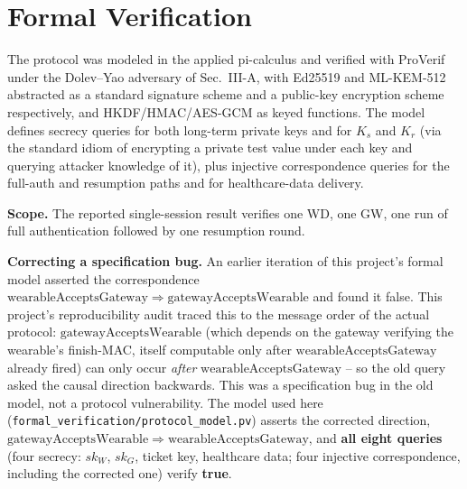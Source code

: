 \documentclass[conference]{IEEEtran}
\begin{document}
\section{Formal Verification}
\label{sec:fv}

The protocol was modeled in the applied pi-calculus and verified with
ProVerif \cite{blanchet2016} under the Dolev--Yao adversary of
Sec.~III-A, with Ed25519 and ML-KEM-512 abstracted as a standard signature
scheme and a public-key encryption scheme respectively, and
HKDF/HMAC/AES-GCM as keyed functions. The model defines secrecy queries for
both long-term private keys and for $K_s$ and $K_r$ (via the standard idiom
of encrypting a private test value under each key and querying attacker
knowledge of it), plus injective correspondence queries for the full-auth
and resumption paths and for healthcare-data delivery.

\textbf{Scope.} The reported single-session result verifies one WD, one GW,
one run of full authentication followed by one resumption round.

\textbf{Correcting a specification bug.} An earlier iteration of this
project's formal model asserted the correspondence
$\mathrm{wearableAcceptsGateway} \Rightarrow \mathrm{gatewayAcceptsWearable}$
and found it false. This project's reproducibility audit traced this to the
message order of the actual protocol: $\mathrm{gatewayAcceptsWearable}$
(which depends on the gateway verifying the wearable's finish-MAC, itself
computable only after $\mathrm{wearableAcceptsGateway}$ already fired) can
only occur \emph{after} $\mathrm{wearableAcceptsGateway}$ -- so the old
query asked the causal direction backwards. This was a specification bug in
the old model, not a protocol vulnerability. The model used here
(\texttt{formal\_verification/protocol\_model.pv}) asserts the corrected
direction, $\mathrm{gatewayAcceptsWearable} \Rightarrow \mathrm{wearableAcceptsGateway}$,
and \textbf{all eight queries} (four secrecy: $sk_W$, $sk_G$, ticket key,
healthcare data; four injective correspondence, including the corrected
one) verify \textbf{true}.
\end{document}
